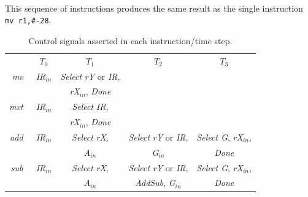 \documentclass[epsfig,10pt,fullpage]{article} \addtolength{\textwidth}{1.5in}
\begin{document}
~\\
This sequence of instructions produces the same result as the single instruction
\texttt{mv  r1,\#-28}.
\begin{table}[H]
\begin{center}
\begin{tabular}{r|c|c|c|c|}
\multicolumn{1}{c}{~} & \multicolumn{1}{c}{$T_0$} & \multicolumn{1}{c}{$T_1$} & \multicolumn{1}{c}{$T_2$} & \multicolumn{1}{c}{$T_3$} \rule[-0.075in]{0in}{0.25in}\\ \cline{2-5}
{\it mv~} & {\it IR}$_{in}$ & \rule[-0.075in]{0in}{0.25in}{\it Select} {\it rY} or {\it IR}, &  &  \\
~ & ~ & {\it rX$_{in}$}, {\it Done} &  &  \\ \cline{2-5}
{\it mvt~} & {\it IR}$_{in}$ & \rule[-0.075in]{0in}{0.25in}{\it Select} {\it IR}, &  &  \\
~ & ~ & {\it rX$_{in}$}, {\it Done} &  &  \\ \cline{2-5}
\rule[-0.075in]{0in}{0.25in}{\it add~} & {\it IR}$_{in}$ & {\it Select} {\it rX}, & {\it Select} {\it rY} or {\it IR}, & {\it Select G}, {\it rX$_{in}$}, \\
~ & ~ & {\it A$_{in}$} &  {\it G$_{in}$} & {\it Done} \\
\cline{2-5}
\rule[-0.075in]{0in}{0.25in}{\it sub~} & {\it IR}$_{in}$ & {\it Select} {\it rX}, & {\it Select} {\it rY} or {\it IR}, & {\it Select G}, {\it rX$_{in}$}, \\
~ & ~ & {\it A$_{in}$} &  {\it AddSub}, {\it G$_{in}$} & {\it Done} \\
\cline{2-5}
\end{tabular}
\caption{Control signals asserted in each instruction/time step.}
\label{tab:control_signals}
\end{center}
\end{table}
\end{document}
